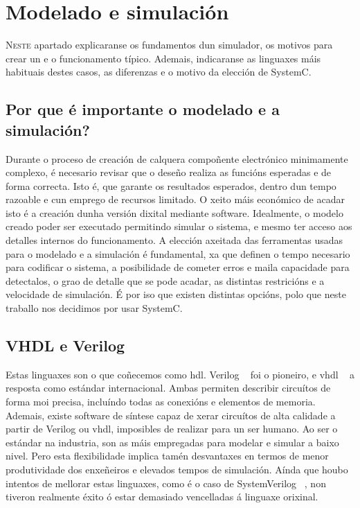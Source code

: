 \chapter{Modelado e simulación}
\label{chap:mod_sim}

\lettrine{N}{este} apartado explicaranse os fundamentos dun simulador, os motivos para crear un e o funcionamento típico. Ademais, indicaranse as linguaxes máis habituais destes casos, as diferenzas e o motivo da elección de SystemC. 

\section{Por que é importante o modelado e a simulación?}\label{sec:mod_sim}
Durante o proceso de creación de calquera compoñente electrónico minimamente complexo, é necesario revisar que o deseño realiza as funcións esperadas e de forma correcta. Isto é, que garante os resultados esperados, dentro dun tempo razoable e cun emprego de recursos limitado. O xeito máis económico de acadar isto é a creación dunha versión dixital mediante software. Idealmente, o modelo creado poder ser executado permitindo simular o sistema, e mesmo ter acceso aos detalles internos do funcionamento. A elección axeitada das ferramentas usadas para o modelado e a simulación é fundamental, xa que definen o tempo necesario para codificar o sistema, a posibilidade de cometer erros e maila capacidade para detectalos, o grao de detalle que se pode acadar, as distintas restricións e a velocidade de simulación. É por iso que existen distintas opcións, polo que neste traballo nos decidimos por usar SystemC.


\section{VHDL e Verilog}\label{sec:vhdl_verilog}
Estas linguaxes son o que coñecemos como \acrfull{hdl}. Verilog ~\cite{vhdl_verilog} foi o pioneiro, e \acrfull{vhdl} ~\cite{vhdl_verilog} a resposta como estándar internacional. Ambas permiten describir circuítos de forma moi precisa, incluíndo todas as conexións e elementos de memoria. Ademais, existe software de síntese capaz de xerar circuítos de alta calidade a partir de Verilog ou \acrshort{vhdl}, imposibles de realizar para un ser humano. Ao ser o estándar na industria, son as máis empregadas para modelar e simular a baixo nivel. Pero esta flexibilidade implica tamén desvantaxes en termos de menor produtividade dos enxeñeiros e elevados tempos de simulación. Aínda que houbo intentos de mellorar estas linguaxes, como é o caso de SystemVerilog ~\cite{system_verilog}, non tiveron realmente éxito ó estar demasiado vencelladas á linguaxe orixinal.

